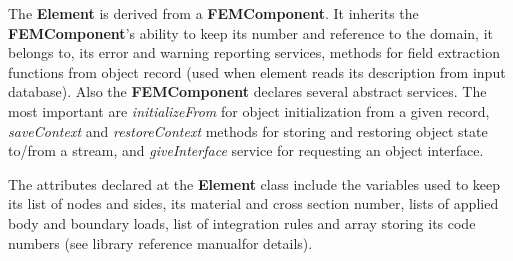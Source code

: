 \documentclass[12pt,draft]{article}
\newcommand{\class}[1]{{\bf #1}}
\newcommand{\service}[1]{{\em #1}}
\newcommand{\refman}{\oofem library reference manual}
\begin{document}
The \class{Element} is derived from a \class{FEMComponent}. It inherits
the \class{FEMComponent}'s ability to keep its number and reference
to the domain, it belongs to, its error and warning
reporting services, methods for field extraction functions from object
record (used when element reads its description from input database).
Also the \class{FEMComponent} declares several abstract services. The most
important are \service{initializeFrom} for object
initialization from a given record, \service{saveContext} and
\service{restoreContext} methods for storing and restoring object state
to/from a stream, and \service{giveInterface} service for requesting
an object interface.

The attributes declared at the \class{Element} class include the 
variables used to keep its list of nodes and sides, its material
and cross section number, lists of applied body and boundary loads,
list of integration rules and array storing its code numbers
(see \refman for details).
\end{document}
